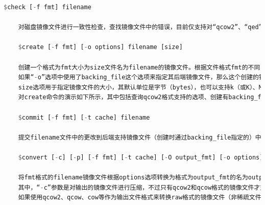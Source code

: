 \begin{lstlisting}[language={Rust}, label={code:forktest},
	caption={forktest.rs}]
	$check [-f fmt] filename
	
	对磁盘镜像文件进行一致性检查，查找镜像文件中的错误，目前仅支持对“qcow2”、“qed”、“vdi”格式文件的检查。其中，qcow2是QEMU 0.8.3版本引入的镜像文件格式，也是目前使用最广泛的格式。qed（QEMU enhanced disk）是从QEMU 0.14版开始加入的增强磁盘文件格式，为了避免qcow2格式的一些缺点，也为了提高性能，不过目前还不够成熟。而vdi（Virtual Disk Image）是Oracle的VirtualBox虚拟机中的存储格式。参数-f fmt是指定文件的格式，如果不指定格式qemu-img会自动检测，filename是磁盘镜像文件的名称（包括路径）。
	
	$create [-f fmt] [-o options] filename [size]
	
	创建一个格式为fmt大小为size文件名为filename的镜像文件。根据文件格式fmt的不同，还可以添加一个或多个选项（options）来附加对该文件的各种功能设置，可以使用“-o ?”来查询某种格式文件支持那些选项，在“-o”选项中各个选项用逗号来分隔。
	如果“-o”选项中使用了backing_file这个选项来指定其后端镜像文件，那么这个创建的镜像文件仅记录与后端镜像文件的差异部分。后端镜像文件不会被修改，除非在QEMU monitor中使用“commit”命令或者使用“qemu-img commit”命令去手动提交这些改动。这种情况下，size参数不是必须需的，其值默认为后端镜像文件的大小。另外，直接使用“-b backfile”参数也与“-o backing_file=backfile”效果相同。
	size选项用于指定镜像文件的大小，其默认单位是字节（bytes），也可以支持k（或K）、M、G、T来分别表示KB、MB、GB、TB大小。另外，镜像文件的大小（size）也并非必须写在命令的最后，它也可以被写在“-o”选项中作为其中一个选项。
	对create命令的演示如下所示，其中包括查询qcow2格式支持的选项、创建有backing_file的qcow2格式的镜像文件、创建没有backing_file的10GB大小的qcow2格式的镜像文件。
	
	$commit [-f fmt] [-t cache] filename
	
	提交filename文件中的更改到后端支持镜像文件（创建时通过backing_file指定的）中去。
	
	$convert [-c] [-p] [-f fmt] [-t cache] [-O output_fmt] [-o options] [-s snapshot_name] [-S sparse_size] filename [filename2 [...]] output_filename
	
	将fmt格式的filename镜像文件根据options选项转换为格式为output_fmt的名为output_filename的镜像文件。它支持不同格式的镜像文件之间的转换，比如可以用VMware用的vmdk格式文件转换为qcow2文件，这对从其他虚拟化方案转移到KVM上的用户非常有用。一般来说，输入文件格式fmt由qemu-img工具自动检测到，而输出文件格式output_fmt根据自己需要来指定，默认会被转换为与raw文件格式（且默认使用稀疏文件的方式存储以节省存储空间）。
	其中，“-c”参数是对输出的镜像文件进行压缩，不过只有qcow2和qcow格式的镜像文件才支持压缩，而且这种压缩是只读的，如果压缩的扇区被重写，则会被重写为未压缩的数据。同样可以使用“-o options”来指定各种选项，如：后端镜像、文件大小、是否加密等等。使用backing_file选项来指定后端镜像，让生成的文件是copy-on-write的增量文件，这时必须让转换命令中指定的后端镜像与输入文件的后端镜像的内容是相同的，尽管它们各自后端镜像的目录、格式可能不同。
	如果使用qcow2、qcow、cow等作为输出文件格式来转换raw格式的镜像文件（非稀疏文件格式），镜像转换还可以起到将镜像文件转化为更小的镜像，因为它可以将空的扇区删除使之在生成的输出文件中并不存在。
	

\end{lstlisting}
